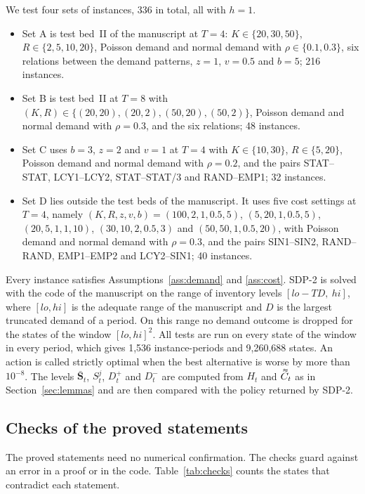 \documentclass[11pt]{article}
\DeclareRobustCommand{\dbtilde}[1]{\accentset{\approx}{#1}}
\renewcommand{\vec}[1]{\boldsymbol{#1}}
\newcommand{\Cq}{\dbtilde{C}}
\theoremstyle{definition}
\begin{document}
We test four sets of instances, 336 in total, all with $h=1$.
\begin{itemize}
\item Set A is test bed~II of the manuscript at $T=4$: $K\in\{20,30,50\}$, $R\in\{2,5,10,20\}$, Poisson demand and normal demand with $\rho\in\{0.1,0.3\}$, six relations between the demand patterns, $z=1$, $v=0.5$ and $b=5$; 216 instances.
\item Set B is test bed~II at $T=8$ with $(K,R)\in\{(20,20),(20,2),(50,20),(50,2)\}$, Poisson demand and normal demand with $\rho=0.3$, and the six relations; 48 instances.
\item Set C uses $b=3$, $z=2$ and $v=1$ at $T=4$ with $K\in\{10,30\}$, $R\in\{5,20\}$, Poisson demand and normal demand with $\rho=0.2$, and the pairs STAT--STAT, LCY1--LCY2, STAT--STAT/3 and RAND--EMP1; 32 instances.
\item Set D lies outside the test beds of the manuscript. It uses five cost settings at $T=4$, namely $(K,R,z,v,b)=(100,2,1,0.5,5)$, $(5,20,1,0.5,5)$, $(20,5,1,1,10)$, $(30,10,2,0.5,3)$ and $(50,50,1,0.5,20)$, with Poisson demand and normal demand with $\rho=0.3$, and the pairs SIN1--SIN2, RAND--RAND, EMP1--EMP2 and LCY2--SIN1; 40 instances.
\end{itemize}
Every instance satisfies Assumptions~\ref{ass:demand} and \ref{ass:cost}. SDP-2 is solved with the code of the manuscript on the range of inventory levels $[lo-TD,\ hi]$, where $[lo,hi]$ is the adequate range of the manuscript and $D$ is the largest truncated demand of a period. On this range no demand outcome is dropped for the states of the window $[lo,hi]^2$. All tests are run on every state of the window in every period, which gives 1,536 instance-periods and 9,260,688 states. An action is called strictly optimal when the best alternative is worse by more than $10^{-8}$. The levels $\bar{\vec{S}}_t$, $S^j_t$, $D^+_t$ and $D^-_t$ are computed from $H_t$ and $\Cq_t$ as in Section~\ref{sec:lemmas} and are then compared with the policy returned by SDP-2.

\subsection{Checks of the proved statements}

The proved statements need no numerical confirmation. The checks guard against an error in a proof or in the code. Table~\ref{tab:checks} counts the states that contradict each statement.
\end{document}
